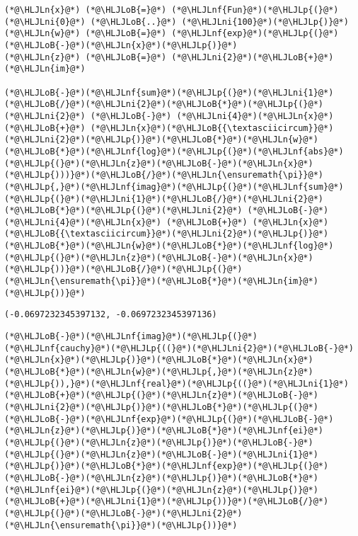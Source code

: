 \documentclass[12pt,landscape]{article}
\newcommand{\HLJLn}[1]{#1}
\newcommand{\HLJLnf}[1]{\textcolor[RGB]{66,102,213}{#1}}
\newcommand{\HLJLni}[1]{\textcolor[RGB]{59,151,46}{#1}}
\newcommand{\HLJLoB}[1]{\textcolor[RGB]{102,102,102}{\textbf{#1}}}
\newcommand{\HLJLp}[1]{#1}
\begin{document}
{\begin{lstlisting}
(*@\HLJLn{x}@*) (*@\HLJLoB{=}@*) (*@\HLJLnf{Fun}@*)(*@\HLJLp{(}@*)(*@\HLJLni{0}@*) (*@\HLJLoB{..}@*) (*@\HLJLni{100}@*)(*@\HLJLp{)}@*)
(*@\HLJLn{w}@*) (*@\HLJLoB{=}@*) (*@\HLJLnf{exp}@*)(*@\HLJLp{(}@*)(*@\HLJLoB{-}@*)(*@\HLJLn{x}@*)(*@\HLJLp{)}@*)
(*@\HLJLn{z}@*) (*@\HLJLoB{=}@*) (*@\HLJLni{2}@*)(*@\HLJLoB{+}@*)(*@\HLJLn{im}@*)

(*@\HLJLoB{-}@*)(*@\HLJLnf{sum}@*)(*@\HLJLp{(}@*)(*@\HLJLni{1}@*)(*@\HLJLoB{/}@*)(*@\HLJLni{2}@*)(*@\HLJLoB{*}@*)(*@\HLJLp{(}@*)(*@\HLJLni{2}@*) (*@\HLJLoB{-}@*) (*@\HLJLni{4}@*)(*@\HLJLn{x}@*) (*@\HLJLoB{+}@*) (*@\HLJLn{x}@*)(*@\HLJLoB{{\textasciicircum}}@*)(*@\HLJLni{2}@*)(*@\HLJLp{)}@*)(*@\HLJLoB{*}@*)(*@\HLJLn{w}@*)(*@\HLJLoB{*}@*)(*@\HLJLnf{log}@*)(*@\HLJLp{(}@*)(*@\HLJLnf{abs}@*)(*@\HLJLp{(}@*)(*@\HLJLn{z}@*)(*@\HLJLoB{-}@*)(*@\HLJLn{x}@*)(*@\HLJLp{)))}@*)(*@\HLJLoB{/}@*)(*@\HLJLn{\ensuremath{\pi}}@*)(*@\HLJLp{,}@*)(*@\HLJLnf{imag}@*)(*@\HLJLp{(}@*)(*@\HLJLnf{sum}@*)(*@\HLJLp{(}@*)(*@\HLJLni{1}@*)(*@\HLJLoB{/}@*)(*@\HLJLni{2}@*)(*@\HLJLoB{*}@*)(*@\HLJLp{(}@*)(*@\HLJLni{2}@*) (*@\HLJLoB{-}@*) (*@\HLJLni{4}@*)(*@\HLJLn{x}@*) (*@\HLJLoB{+}@*) (*@\HLJLn{x}@*)(*@\HLJLoB{{\textasciicircum}}@*)(*@\HLJLni{2}@*)(*@\HLJLp{)}@*)(*@\HLJLoB{*}@*)(*@\HLJLn{w}@*)(*@\HLJLoB{*}@*)(*@\HLJLnf{log}@*)(*@\HLJLp{(}@*)(*@\HLJLn{z}@*)(*@\HLJLoB{-}@*)(*@\HLJLn{x}@*)(*@\HLJLp{))}@*)(*@\HLJLoB{/}@*)(*@\HLJLp{(}@*)(*@\HLJLn{\ensuremath{\pi}}@*)(*@\HLJLoB{*}@*)(*@\HLJLn{im}@*)(*@\HLJLp{))}@*)
\end{lstlisting}

\begin{lstlisting}
(-0.0697232345397132, -0.0697232345397136)
\end{lstlisting}


\begin{lstlisting}
(*@\HLJLoB{-}@*)(*@\HLJLnf{imag}@*)(*@\HLJLp{(}@*)(*@\HLJLnf{cauchy}@*)(*@\HLJLp{((}@*)(*@\HLJLni{2}@*)(*@\HLJLoB{-}@*)(*@\HLJLn{x}@*)(*@\HLJLp{)}@*)(*@\HLJLoB{*}@*)(*@\HLJLn{x}@*)(*@\HLJLoB{*}@*)(*@\HLJLn{w}@*)(*@\HLJLp{,}@*)(*@\HLJLn{z}@*)(*@\HLJLp{)),}@*)(*@\HLJLnf{real}@*)(*@\HLJLp{((}@*)(*@\HLJLni{1}@*)(*@\HLJLoB{+}@*)(*@\HLJLp{(}@*)(*@\HLJLn{z}@*)(*@\HLJLoB{-}@*)(*@\HLJLni{2}@*)(*@\HLJLp{)}@*)(*@\HLJLoB{*}@*)(*@\HLJLp{(}@*)(*@\HLJLoB{-}@*)(*@\HLJLnf{exp}@*)(*@\HLJLp{(}@*)(*@\HLJLoB{-}@*)(*@\HLJLn{z}@*)(*@\HLJLp{)}@*)(*@\HLJLoB{*}@*)(*@\HLJLnf{ei}@*)(*@\HLJLp{(}@*)(*@\HLJLn{z}@*)(*@\HLJLp{)}@*)(*@\HLJLoB{-}@*)(*@\HLJLp{(}@*)(*@\HLJLn{z}@*)(*@\HLJLoB{-}@*)(*@\HLJLni{1}@*)(*@\HLJLp{)}@*)(*@\HLJLoB{*}@*)(*@\HLJLnf{exp}@*)(*@\HLJLp{(}@*)(*@\HLJLoB{-}@*)(*@\HLJLn{z}@*)(*@\HLJLp{)}@*)(*@\HLJLoB{*}@*)(*@\HLJLnf{ei}@*)(*@\HLJLp{(}@*)(*@\HLJLn{z}@*)(*@\HLJLp{)}@*)(*@\HLJLoB{+}@*)(*@\HLJLni{1}@*)(*@\HLJLp{))}@*)(*@\HLJLoB{/}@*)(*@\HLJLp{(}@*)(*@\HLJLoB{-}@*)(*@\HLJLni{2}@*)(*@\HLJLn{\ensuremath{\pi}}@*)(*@\HLJLp{))}@*)
\end{lstlisting}

}
\end{document}
